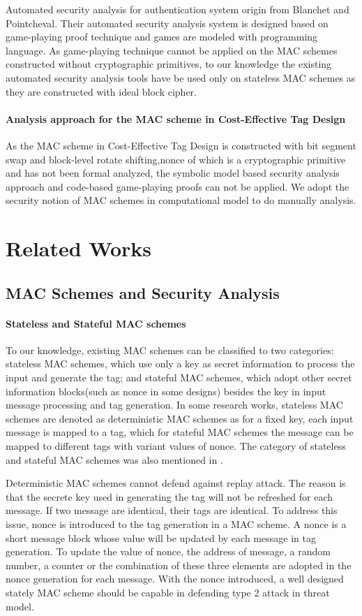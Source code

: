 \documentclass{article}
\begin{document}
Automated security analysis for authentication system origin from Blanchet and
Pointcheval\cite{blanchet2006automated}. Their automated security analysis system is designed based on
game-playing proof technique and games are modeled with programming language. As
game-playing technique cannot be applied on the MAC schemes constructed without
cryptographic primitives, to our knowledge the existing automated security analysis tools have be used only
on stateless MAC schemes as they are constructed with ideal block cipher.   
\paragraph{Analysis approach for the MAC scheme in Cost-Effective Tag Design}
As the MAC scheme in Cost-Effective Tag Design is constructed with bit segment
swap and block-level rotate shifting,nonce of which is a cryptographic primitive
and has not been formal analyzed, the symbolic model based security analysis
approach and code-based game-playing proofs can not be applied. We adopt the
security notion of MAC schemes in computational model to do manually analysis.

\section{Related Works} 
\subsection{MAC Schemes and Security Analysis}
\paragraph{Stateless and Stateful MAC schemes}
To our knowledge, existing MAC schemes can be classified to two categories:
stateless MAC schemes, which use only a key as secret information to process the
input and generate the tag; and stateful MAC schemes, which adopt other secret
information blocks(such as nonce in some designs) besides the key in input message
processing and tag generation. In some research works, stateless MAC schemes are denoted as deterministic MAC schemes as for a fixed key, each input message is mapped to a tag, which for stateful MAC schemes the message can be mapped to different tags with variant values of nonce.
The category of stateless and stateful MAC schemes was also mentioned in \cite{xor-mac}.

Deterministic MAC schemes cannot defend against replay attack. The reason is that the secrete key used in generating the tag will not be refreshed for each message. If two message are identical, their tags are identical. To address this issue, nonce is introduced to the tag generation in a MAC scheme. A nonce is a short message block whose value will be updated by each message in tag generation. To update the value of nonce, the address of message, a random number, a counter or the combination of these three elements are adopted in the nonce generation for each message. With the nonce introduced, a well designed stately MAC scheme should be capable in defending type 2 attack in threat model.
\end{document}
